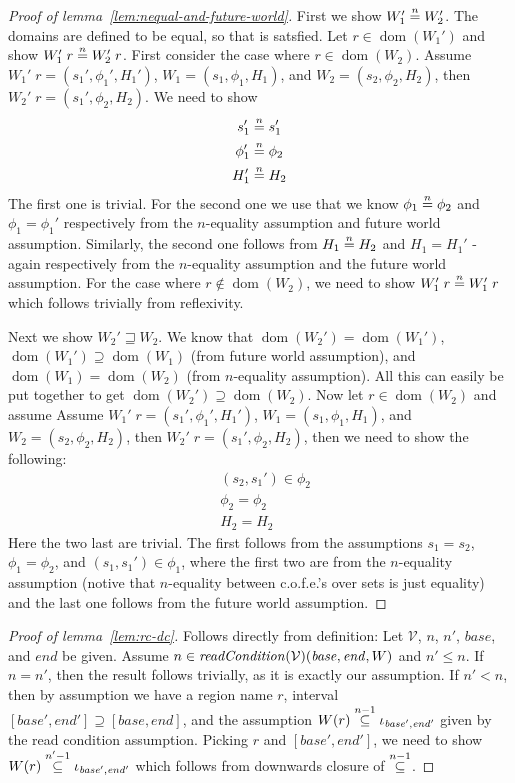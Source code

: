 \documentclass{article}
\newcommand{\nequal}[1][n]{\stackrel{\tiny{#1}}{=}}
\newcommand{\nsubeq}[1][n]{\stackrel{\tiny{#1}}{\subseteq}}
\DeclareMathOperator{\dom}{dom}
\newcommand{\cofe}{c.o.f.e.}
\newcommand{\cofes}{\cofe{}'s}
\newcommand{\var}[1]{\mathit{#1}}
\newcommand{\start}{\var{base}}
\newcommand{\addrend}{\var{end}}
\newcommand{\plainfun}[2]{
  \ifthenelse{\equal{#2}{}}
             {\mathit{#1}}
             {\mathit{#1}(#2)}
}
\newcommand{\readCond}[1]{\plainfun{readCondition}{#1}}
\newcommand{\future}{\mathbin{\sqsupseteq}}
\newcommand{\asmType}{\plaindom{AsmType}}
\newcommand{\plaindom}[1]{\mathrm{#1}}
\newcommand{\intr}[2]{\mathcal{#1}}
\newcommand{\valueintr}[1]{\intr{V}{#1}}
\newcommand{\stdvr}{\valueintr{\asmType}}
\begin{document}
\begin{appendices}
\begin{proof}[Proof of lemma~\ref{lem:nequal-and-future-world}]
First we show $W_1' \nequal W_2'$. The domains are defined to be equal, so that is satsfied. Let $r \in \dom(W_1')$ and show $W_1' \; r \nequal W_2' \; r$. First consider the case where $r \in \dom(W_2)$. Assume $W_1' \; r = (s_1',\phi_1',H_1')$, $W_1 = (s_1,\phi_1,H_1)$, and $W_2 = (s_2,\phi_2,H_2)$, then $W_2' \; r = (s_1',\phi_2,H_2)$. We need to show
\begin{align*}
  s_1' & \nequal s_1' \\
  \phi_1' & \nequal \phi_2 \\
  H_1' & \nequal H_2
\end{align*}
The first one is trivial. For the second one we use that we know $\phi_1 \nequal \phi_2$ and $\phi_1 = \phi_1'$ respectively from the $n$-equality assumption and future world assumption. Similarly, the second one follows from $H_1 \nequal H_2$ and $H_1 = H_1'$ - again respectively from the $n$-equality assumption and the future world assumption. For the case where $r \not\in \dom(W_2)$, we need to show $W_1' \; r \nequal W_1' \; r$ which follows trivially from reflexivity.

Next we show $W_2' \future W_2$. We know that $\dom(W_2') = \dom(W_1')$, $\dom(W_1') \supseteq \dom(W_1)$ (from future world assumption), and $\dom(W_1) = \dom(W_2)$ (from $n$-equality assumption). All this can easily be put together to get $\dom(W_2') \supseteq \dom(W_2)$. Now let $r\in \dom(W_2)$ and assume Assume $W_1' \; r = (s_1',\phi_1',H_1')$, $W_1 = (s_1,\phi_1,H_1)$, and $W_2 = (s_2,\phi_2,H_2)$, then $W_2' \; r = (s_1',\phi_2,H_2)$, then we need to show the following:
\begin{align*}
  &(s_2,s_1') \in \phi_2 \\
  &\phi_2 = \phi_2 \\
  &H_2 = H_2
\end{align*}
Here the two last are trivial. The first follows from the assumptions $s_1 = s_2$, $\phi_1 = \phi_2$, and $(s_1,s_1') \in \phi_1$, where the first two are from the $n$-equality assumption (notive that $n$-equality between \cofes{} over sets is just equality) and the last one follows from the future world assumption.
\end{proof}

\begin{proof}[Proof of lemma~\ref{lem:rc-dc}]
  Follows directly from definition: Let $\stdvr$, $n$, $n'$, $\start$, and  $\addrend$ be given. Assume $n \in \readCond{}(\stdvr)(\start,\addrend,W)$ and $n' \leq n$. If $n=n'$, then the result follows trivially, as it is exactly our assumption. If $n' < n$, then by assumption we have a region name $r$, interval $[\start',\addrend'] \supseteq [\start,\addrend]$, and the assumption $W(r) \nsubeq[n-1] \iota_{\start',\addrend'}$  given by the read condition assumption. Picking $r$ and $[\start',\addrend']$, we need to show  $W(r) \nsubeq[n'-1] \iota_{\start',\addrend'}$ which follows from downwards closure of $\nsubeq[n-1]$.
\end{proof}


\end{appendices}
\end{document}
